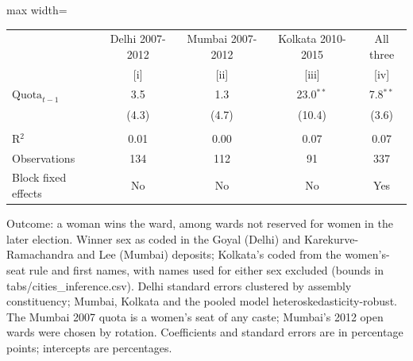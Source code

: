 
\begingroup
\centering
\scriptsize
\begin{adjustbox}{max width=\linewidth}
   \begin{threeparttable}[b]
      \begin{tabular}{lcccc}
         \toprule
                               & Delhi 2007-2012 & Mumbai 2007-2012 & Kolkata 2010-2015 & All three \\
                               & [i]             & [ii]             & [iii]             & [iv]\\
         \midrule
         $\text{Quota}_{t-1}$  & 3.5             & 1.3              & 23.0$^{**}$       & 7.8$^{**}$\\
                               & (4.3)           & (4.7)            & (10.4)            & (3.6)\\
          \\
         R$^2$                 & 0.01            & 0.00             & 0.07              & 0.07\\
         Observations          & 134             & 112              & 91                & 337\\
         Block fixed effects   & No              & No               & No                & Yes\\
         \bottomrule
      \end{tabular}

      \begin{tablenotes}
         \item Outcome: a woman wins the ward, among wards not reserved for women in the later election. Winner sex as coded in the Goyal (Delhi) and Karekurve-Ramachandra and Lee (Mumbai) deposits; Kolkata's coded from the women's-seat rule and first names, with names used for either sex excluded (bounds in tabs/cities\_inference.csv). Delhi standard errors clustered by assembly constituency; Mumbai, Kolkata and the pooled model heteroskedasticity-robust. The Mumbai 2007 quota is a women's seat of any caste; Mumbai's 2012 open wards were chosen by rotation. Coefficients and standard errors are in percentage points; intercepts are percentages.
      \end{tablenotes}
   \end{threeparttable}
\end{adjustbox}
\par\endgroup


